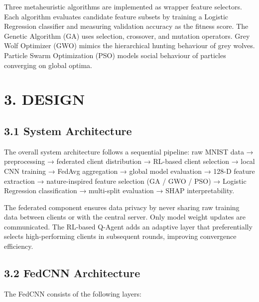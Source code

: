 \documentclass[
]{article}
\begin{document}
Three metaheuristic algorithms are implemented as wrapper feature
selectors. Each algorithm evaluates candidate feature subsets by
training a Logistic Regression classifier and measuring validation
accuracy as the fitness score. The Genetic Algorithm (GA) uses
selection, crossover, and mutation operators. Grey Wolf Optimizer (GWO)
mimics the hierarchical hunting behaviour of grey wolves. Particle Swarm
Optimization (PSO) models social behaviour of particles converging on
global optima.

\hypertarget{design}{%
\section{3. DESIGN}\label{design}}

\hypertarget{system-architecture}{%
\subsection{3.1 System Architecture}\label{system-architecture}}

The overall system architecture follows a sequential pipeline: raw MNIST
data → preprocessing → federated client distribution → RL-based client
selection → local CNN training → FedAvg aggregation → global model
evaluation → 128-D feature extraction → nature-inspired feature
selection (GA / GWO / PSO) → Logistic Regression classification →
multi-split evaluation → SHAP interpretability.

The federated component ensures data privacy by never sharing raw
training data between clients or with the central server. Only model
weight updates are communicated. The RL-based Q-Agent adds an adaptive
layer that preferentially selects high-performing clients in subsequent
rounds, improving convergence efficiency.

\hypertarget{fedcnn-architecture}{%
\subsection{3.2 FedCNN Architecture}\label{fedcnn-architecture}}

The FedCNN consists of the following layers:
\end{document}
